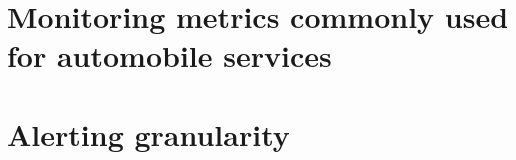 \section{Monitoring metrics commonly used for automobile services}
\lipsum[2-4]


\section{Alerting granularity}
\lipsum[2-4]